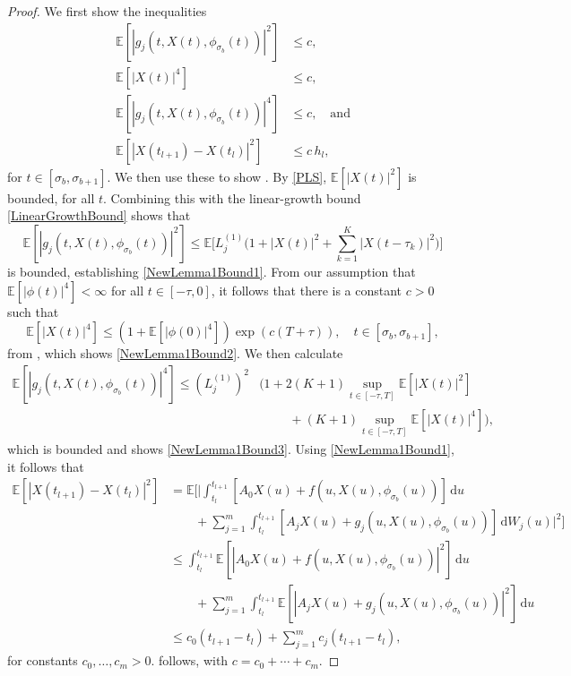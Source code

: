 \documentclass[onefignum]{siamart250211}
\providecommand{\abs}[1]{\left|#1\right|}
\begin{document}
\begin{proof}
We first show the inequalities
\begin{align}
\mathbb{E}\left[\abs{g_j(t,X(t),\phi_{\sigma_b}(t))}^2\right]&\leqslant c,\label{NewLemma1Bound1}\\
\mathbb{E}\left[\abs{X(t)}^4\right]&\leqslant c,\label{NewLemma1Bound2}\\
\mathbb{E}\left[\abs{g_j(t,X(t),\phi_{\sigma_b}(t))}^4\right]&\leqslant c,\quad\textrm{and}\label{NewLemma1Bound3}\\
\mathbb{E}\left[\abs{X(t_{l+1})-X(t_l)}^2\right]&\leqslant c\,h_l,\label{NewLemma1Bound4}
\end{align}
for $t\in[\sigma_b,\sigma_{b+1}]$. We then use these to show . By \cref{PLS}, $\mathbb{E}[\abs{X(t)}^2]$ is bounded, for all $t$. Combining this with the linear-growth bound \cref{LinearGrowthBound} shows that
\begin{equation*}
\mathbb{E}\left[\abs{g_j(t,X(t),\phi_{\sigma_b}(t))}^2\right]\leqslant\mathbb{E}\bigg[L_j^{(1)}\bigg(1+\abs{X(t)}^2+\sum_{k=1}^K\abs{X(t-\tau_k)}^2\bigg)\bigg]
\end{equation*}
is bounded, establishing \cref{NewLemma1Bound1}. From our assumption that $\mathbb{E}[\abs{\phi(t)}^4]<\infty$ for all $t\in[-\tau,0]$, it follows that there is a constant $c>0$ such that
\[\mathbb{E}\left[\abs{X(t)}^4\right]\leqslant\left(1+\mathbb{E}\left[\abs{\phi(0)}^4\right]\right)\exp(c(T+\tau)),\quad t\in[\sigma_b,\sigma_{b+1}],\]
from \cite[page 136]{KloedenPlaten1999}, which shows \cref{NewLemma1Bound2}. We then calculate
\begin{align*}
\mathbb{E}\left[\abs{g_j(t,X(t),\phi_{\sigma_b}(t))}^4\right]\leqslant\left(L_j^{(1)}\right)^2&\bigg(1+2(K+1)\sup_{t\in[-\tau,T]}\mathbb{E}\left[\abs{X(t)}^2\right]\\
&\hspace{1cm}+(K+1)\sup_{t\in[-\tau,T]}\mathbb{E}\left[\abs{X(t)}^4\right]\bigg),
\end{align*}
which is bounded and shows \cref{NewLemma1Bound3}. Using \cref{NewLemma1Bound1}, it follows that
\begin{align*}
\mathbb{E}\left[\abs{X(t_{l+1})-X(t_l)}^2\right]&=\mathbb{E}\bigg[\bigg|\int_{t_l}^{t_{l+1}}[A_0X(u)+f(u,X(u),\phi_{\sigma_b}(u))]\,\mathrm{d}u\\
&\quad\quad+\sum_{j=1}^m\int_{t_l}^{t_{l+1}}[A_jX(u)+g_j(u,X(u),\phi_{\sigma_b}(u))]\,\mathrm{d}W_j(u)\bigg|^2\bigg]\\
&\leqslant\int_{t_l}^{t_{l+1}}\mathbb{E}\left[\abs{A_0X(u)+f(u,X(u),\phi_{\sigma_b}(u))}^2\right]\,\mathrm{d}u\\
&\quad\quad+\sum_{j=1}^m\int_{t_l}^{t_{l+1}}\mathbb{E}\left[\abs{A_jX(u)+g_j(u,X(u),\phi_{\sigma_b}(u))}^2\right]\,\mathrm{d}u\\
&\leqslant c_0(t_{l+1}-t_l)+\sum_{j=1}^mc_j(t_{l+1}-t_l),
\end{align*}
for constants $c_0,\ldots,c_m>0$.  follows, with $c=c_0+\cdots+c_m$.


\end{proof}
\end{document}
